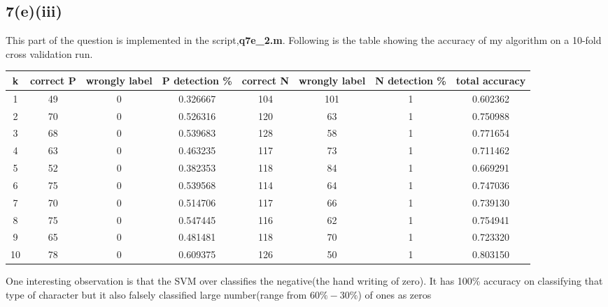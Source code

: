 \subsection*{7(e)(iii)}
This part of the question is implemented in the script,\textbf{q7e\_2.m}.
Following is the table showing the accuracy of my algorithm on a 10-fold cross validation run.\\
\begin{centering}
\begin{tabular}{|c|c|c|c|c|c|c|c|}
\hline
k & correct P & wrongly label & P detection \% & correct N & wrongly label & N detection \% & total accuracy \\ \hline
1 & 49 & 0 & 0.326667 & 104 & 101 & 1 & 0.602362 \\ \hline 
2 & 70 & 0 & 0.526316 & 120 & 63 & 1 &0.750988 \\ \hline 
3 & 68 & 0 & 0.539683 & 128 & 58 & 1 &0.771654 \\ \hline 
4 & 63 & 0 & 0.463235 & 117 & 73 & 1 &0.711462 \\ \hline 
5 & 52 & 0 & 0.382353 & 118 & 84 & 1 &0.669291 \\ \hline 
6 & 75 & 0 & 0.539568 & 114 & 64 & 1 &0.747036 \\ \hline 
7 & 70 & 0 & 0.514706 & 117 & 66 & 1 &0.739130 \\ \hline 
8 & 75 & 0 & 0.547445 & 116 & 62 & 1 &0.754941 \\ \hline 
9 & 65 & 0 & 0.481481 & 118 & 70 & 1 &0.723320 \\ \hline 
10 & 78 & 0 & 0.609375 & 126 & 50 & 1 &0.803150 \\ \hline 
\end{tabular}
\end{centering}
One interesting observation is that the SVM over classifies the negative(the hand writing of zero). It has 100\% accuracy on classifying that type of character but it also falsely classified large number(range from $60\% - 30\%$) of ones as zeros
